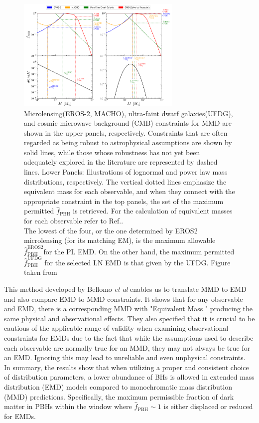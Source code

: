 \begin{figure}[h] \label{fig 4.2}
    \centering
    \includegraphics[width=0.7\textwidth]{Bellomo.png}
    \caption{Microlensing(EROS-2, MACHO), ultra-faint dwarf galaxies(UFDG), and cosmic microwave background (CMB) constraints for MMD are shown in the upper panels, respectively. Constraints that are often regarded as being robust to astrophysical assumptions are shown by solid lines, while those whose robustness has not yet been adequately explored in the literature are represented by dashed lines. Lower Panels: Illustrations of lognormal and power law mass distributions, respectively. The vertical dotted lines emphasize the equivalent mass for each observable, and when they connect with the appropriate constraint in the top panels, the set of the maximum permitted  $\hat{f}_{\mathrm{PBH}}$ is retrieved. For the calculation of equivalent masses for each observable refer to Ref.\cite{Bellomo:2017zsr}.\\
    The lowest of the four, or the one determined by EROS2 microlensing (for its matching EM), is the maximum allowable $\hat{f}_{\mathrm{PBH}}^{\mathrm{EROS} 2}$for the PL EMD. On the other hand, the maximum permitted $\hat{f}_{\mathrm{PBH}}^{\mathrm{UFDG}}$ for the selected LN EMD is that given by the UFDG. Figure taken from \cite{Bellomo:2017zsr}  }
    
\end{figure}
This method developed by Bellomo \emph{et al} \cite{Bellomo:2017zsr} enables us to translate MMD to EMD and also compare EMD to MMD constraints. It shows that for any  observable and EMD, there is a corresponding MMD with "Equivalent Mass " producing the same physical and observational effects. They also specified that it is crucial to be cautious of the applicable range of validity when examining observational constraints for EMDs due to the fact that while the assumptions used to describe each observable are normally true for an MMD, they may not always be true for an EMD. Ignoring this may lead to unreliable and even unphysical constraints.\\

In summary, the results show that when utilizing a proper and consistent choice of distribution parameters, a lower abundance of BHs is allowed in extended mass distribution (EMD) models compared to monochromatic mass distribution (MMD) predictions. Specifically, the maximum permissible fraction of dark matter in PBHs within the window where $\hat{f}_{\mathrm{PBH}} \sim 1$ is either displaced or reduced for EMDs.